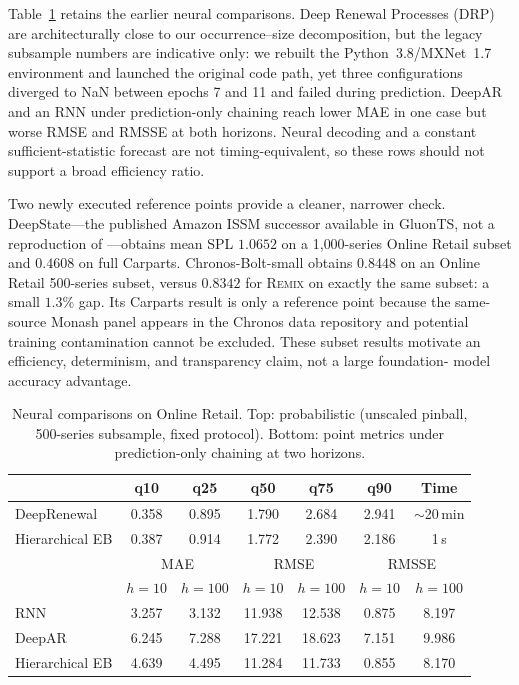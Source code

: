 \documentclass[twocolumn,10pt]{article}
\theoremstyle{definition}
\newcommand{\REMIX}{\textsc{Remix}}
\begin{document}
Table~\ref{tab:neural} retains the earlier neural comparisons. Deep
Renewal Processes (DRP) \citep{turkmen2019} are architecturally close to
our occurrence--size decomposition, but the legacy subsample numbers are
indicative only: we rebuilt the Python~3.8/MXNet~1.7 environment and
launched the original code path, yet three configurations diverged to
NaN between epochs 7 and 11 and failed during prediction. DeepAR and an
RNN under prediction-only chaining reach lower MAE in one case but worse
RMSE and RMSSE at both horizons. Neural decoding and a constant
sufficient-statistic forecast are not timing-equivalent, so these rows
should not support a broad efficiency ratio.

Two newly executed reference points provide a cleaner, narrower check.
DeepState---the published Amazon ISSM successor available in GluonTS,
not a reproduction of \citet{seeger2016}---obtains mean SPL $1.0652$ on
a 1{,}000-series Online Retail subset and $0.4608$ on full Carparts.
Chronos-Bolt-small obtains $0.8448$ on an Online Retail 500-series subset,
versus $0.8342$ for \REMIX{} on exactly the same subset: a small $1.3\%$
gap. Its Carparts result is only a reference point because the same-source
Monash panel appears in the Chronos data repository and potential training
contamination cannot be excluded. These subset results motivate an
efficiency, determinism, and transparency claim, not a large foundation-
model accuracy advantage.

\begin{table}[t]
\centering
\caption{Neural comparisons on Online Retail. Top: probabilistic
(unscaled pinball, 500-series subsample, fixed protocol). Bottom: point
metrics under prediction-only chaining at two horizons.}
\label{tab:neural}
\small
\setlength{\tabcolsep}{4pt}
\begin{tabular}{lcccccc}
\toprule
 & q10 & q25 & q50 & q75 & q90 & Time\\
\midrule
DeepRenewal & 0.358 & 0.895 & 1.790 & 2.684 & 2.941 & $\sim$20\,min\\
Hierarchical EB & 0.387 & 0.914 & 1.772 & 2.390 & 2.186 & 1\,s\\
\midrule
 & \multicolumn{2}{c}{MAE} & \multicolumn{2}{c}{RMSE} & \multicolumn{2}{c}{RMSSE}\\
 & $h{=}10$ & $h{=}100$ & $h{=}10$ & $h{=}100$ & $h{=}10$ & $h{=}100$\\
\midrule
RNN & 3.257 & 3.132 & 11.938 & 12.538 & 0.875 & 8.197\\
DeepAR & 6.245 & 7.288 & 17.221 & 18.623 & 7.151 & 9.986\\
Hierarchical EB & 4.639 & 4.495 & 11.284 & 11.733 & 0.855 & 8.170\\
\bottomrule
\end{tabular}
\end{table}
\end{document}
